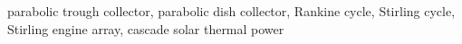 {%




}
\enkeywords
{parabolic trough collector, parabolic dish collector, Rankine cycle, Stirling cycle, Stirling engine array, cascade solar thermal power}
